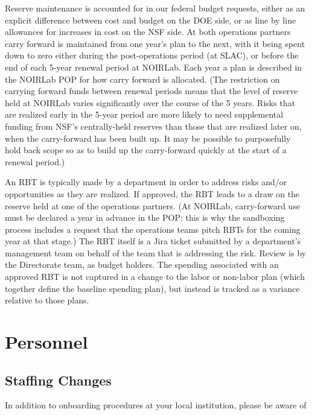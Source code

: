 Reserve maintenance is accounted for in our federal budget requests, either as an explicit difference between cost and budget on the \gls{DOE} side, or as line by line allowances for increases in cost on the \gls{NSF} side.
At both operations partners carry forward is maintained from one year's plan to the next, with it being spent down to zero either during the post-operations period (at \gls{SLAC}), or before the end of each 5-year renewal period at \gls{NOIRLab}.
Each year a plan is described in the \gls{NOIRLab} \gls{POP} for how carry forward is allocated.
(The restriction on carrying forward funds between renewal periods means that the level of reserve held at \gls{NOIRLab} varies significantly over the course of the 5 years.
Risks that are realized early in the 5-year period are more likely to need supplemental funding from \gls{NSF}'s centrally-held reserves than those that are realized later on, when the carry-forward has been built up.
It may be possible to purposefully hold back scope so as to build up the carry-forward quickly at the start of a renewal period.)

An \gls{RBT} is typically made by a department in order to address risks and/or opportunities as they are realized.
If approved, the \gls{RBT} leads to a draw on the reserve held at one of the operations partners.
(At \gls{NOIRLab}, carry-forward use must be declared a year in advance in the \gls{POP}: this is why the sandboxing process includes a request that the operations teams pitch RBTs for the coming year at that stage.)
The \gls{RBT} itself is a Jira ticket submitted by a department's management team on behalf of the team that is addressing the risk.
Review is by the Directorate team, as budget holders.
The spending associated with an approved \gls{RBT} is not captured in a change to the labor or non-labor plan (which together define the baseline spending plan), but instead is tracked as a variance relative to those plans.

\section{Personnel}

\subsection{Staffing Changes}
\label{sec:staffing}

In addition to onboarding procedures at your local institution, please
be aware of

